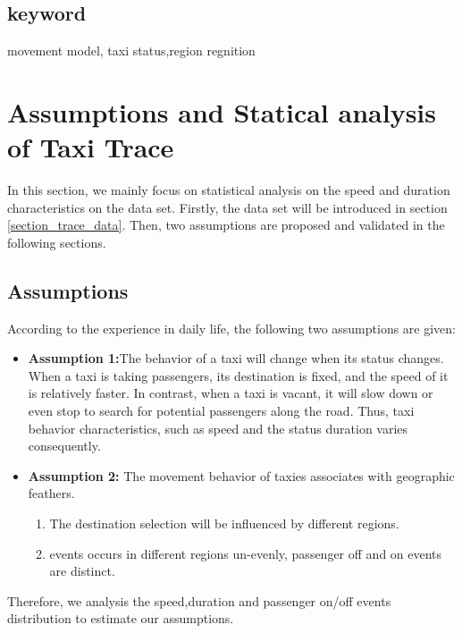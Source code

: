 \documentclass[letterpaper,twocolumn,10pt]{IEEEtran}
\begin{document}
\subsection*{keyword}
movement model, taxi status,region regnition





\section{Assumptions and Statical analysis of Taxi Trace}
\label{section_assumptions_anlysis}

In this section, we mainly focus on statistical analysis on the speed and duration characteristics on the data set.
Firstly, the data set will be introduced in section \ref{section_trace_data}. Then, two assumptions are proposed and validated in the following sections.



\subsection{Assumptions}
\label{section_statistic_analysis}
According to the experience in daily life, the following two assumptions are given:

\begin{itemize}
  \item \textbf{Assumption 1:}The behavior of a taxi will change when its status changes. When a taxi is taking passengers, its destination is fixed, and the speed of it is relatively faster. In contrast, when a taxi is vacant, it will slow down or even stop to search for potential passengers along the road. Thus, taxi behavior characteristics, such as speed and the status duration varies consequently.

  \item \textbf{Assumption 2:} The movement behavior of taxies associates with geographic feathers.
      \begin{enumerate}
        \item The destination selection will be influenced by different regions.
        \item events occurs in different regions un-evenly, passenger off and on events are distinct.
      \end{enumerate}
\end{itemize}


   Therefore, we analysis the speed,duration and passenger on/off events distribution to estimate our assumptions.
\end{document}
